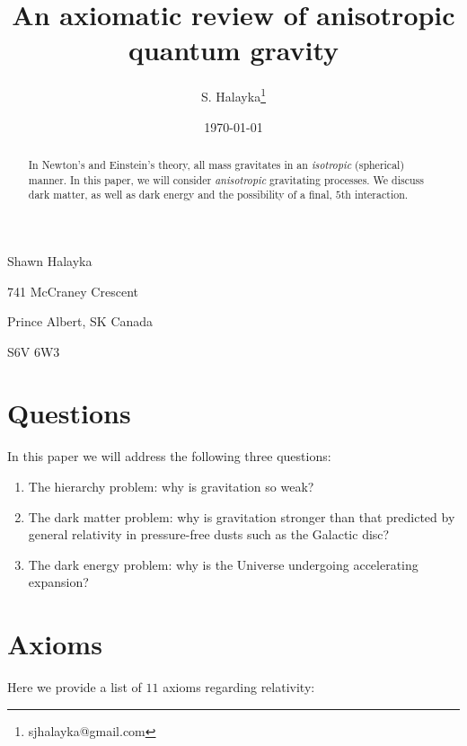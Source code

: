 \documentclass[12pt]{article}
\title{An axiomatic review of anisotropic quantum gravity}
\author{S. Halayka\footnote{sjhalayka@gmail.com}}
\date{\today\;\currenttime}
\begin{document}
 
\maketitle



Shawn Halayka

741 McCraney Crescent

Prince Albert, SK Canada

S6V 6W3



\begin{abstract}
In Newton's and Einstein's theory, all mass gravitates in an {\textit{isotropic}} (spherical) manner.
In this paper, we will consider {\textit{anisotropic}} gravitating processes.
We discuss dark matter, as well as dark energy and the possibility of a final, $5$th interaction.
\end{abstract}


\section{Questions}

In this paper we will address the following three questions:
\begin{enumerate}
\item The hierarchy problem: why is gravitation so weak?
\item The dark matter problem: why is gravitation stronger than that predicted by general relativity in pressure-free dusts such as the Galactic disc?
\item The dark energy problem: why is the Universe undergoing accelerating expansion?
\end{enumerate}






\section{Axioms}

Here we provide a list of $11$ axioms regarding relativity:
\end{document}
